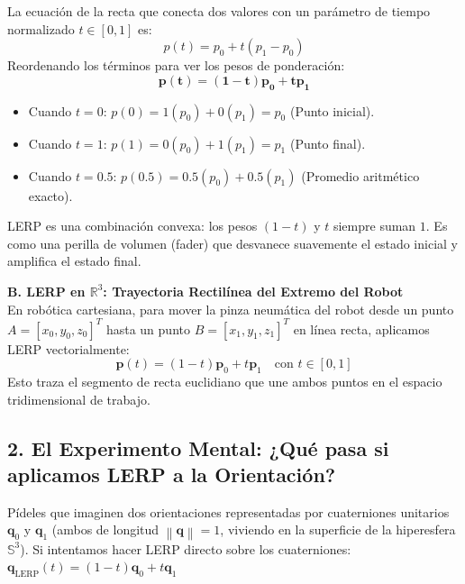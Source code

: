\documentclass[11pt, a4paper]{article}
\begin{document}
La ecuación de la recta que conecta dos valores con un parámetro de tiempo normalizado $t \in [0, 1]$ es:
\begin{equation*}
    p(t) = p_0 + t(p_1 - p_0)
\end{equation*}
Reordenando los términos para ver los pesos de ponderación:
\begin{equation}
    \mathbf{p(t) = (1 - t)p_0 + t p_1}
\end{equation}
\begin{itemize}[label=$\circ$]
    \item Cuando $t = 0$: $p(0) = 1(p_0) + 0(p_1) = p_0$ (Punto inicial).
    \item Cuando $t = 1$: $p(1) = 0(p_0) + 1(p_1) = p_1$ (Punto final).
    \item Cuando $t = 0.5$: $p(0.5) = 0.5(p_0) + 0.5(p_1)$ (Promedio aritmético exacto).
\end{itemize}

\begin{tcolorbox}[colback=yellow!10!white, colframe=ucbyellow!80!black, title=Concepto Clave para el Alumno]
LERP es una combinación convexa: los pesos $(1-t)$ y $t$ siempre suman $1$. Es como una perilla de volumen (fader) que desvanece suavemente el estado inicial y amplifica el estado final.
\end{tcolorbox}

\textbf{B. LERP en $\mathbb{R}^3$: Trayectoria Rectilínea del Extremo del Robot}\\
En robótica cartesiana, para mover la pinza neumática del robot desde un punto $A = [x_0, y_0, z_0]^T$ hasta un punto $B = [x_1, y_1, z_1]^T$ en línea recta, aplicamos LERP vectorialmente:
\begin{equation*}
    \mathbf{p}(t) = (1 - t)\mathbf{p}_0 + t\mathbf{p}_1 \quad \text{con } t \in [0, 1]
\end{equation*}
Esto traza el segmento de recta euclidiano que une ambos puntos en el espacio tridimensional de trabajo.

\subsection*{2. El Experimento Mental: ¿Qué pasa si aplicamos LERP a la Orientación?}
Pídeles que imaginen dos orientaciones representadas por cuaterniones unitarios $\mathbf{q}_0$ y $\mathbf{q}_1$ (ambos de longitud $\left\|\mathbf{q}\right\| = 1$, viviendo en la superficie de la hiperesfera $\mathbb{S}^3$).
Si intentamos hacer LERP directo sobre los cuaterniones: $\mathbf{q}_{\text{LERP}}(t) = (1 - t)\mathbf{q}_0 + t\mathbf{q}_1$
\end{document}
